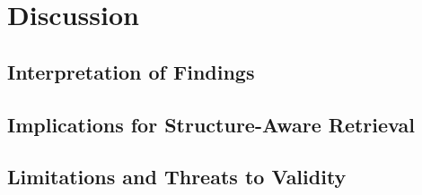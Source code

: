 \newpage

\section{Discussion}
\label{sec:07_discussion}

\subsection{Interpretation of Findings}

\subsection{Implications for Structure-Aware Retrieval}

\subsection{Limitations and Threats to Validity}

